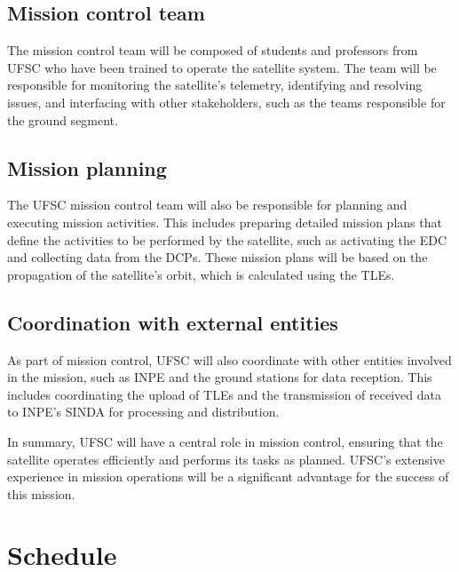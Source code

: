 \subsection{Mission control team}

The mission control team will be composed of students and professors from UFSC who have been trained to operate the satellite system. The team will be responsible for monitoring the satellite's telemetry, identifying and resolving issues, and interfacing with other stakeholders, such as the teams responsible for the ground segment.

\subsection{Mission planning}

The UFSC mission control team will also be responsible for planning and executing mission activities. This includes preparing detailed mission plans that define the activities to be performed by the satellite, such as activating the EDC and collecting data from the DCPs. These mission plans will be based on the propagation of the satellite's orbit, which is calculated using the TLEs.

\subsection{Coordination with external entities}

As part of mission control, UFSC will also coordinate with other entities involved in the mission, such as INPE and the ground stations for data reception. This includes coordinating the upload of TLEs and the transmission of received data to INPE's SINDA for processing and distribution.

In summary, UFSC will have a central role in mission control, ensuring that the satellite operates efficiently and performs its tasks as planned. UFSC's extensive experience in mission operations will be a significant advantage for the success of this mission.

\section{Schedule}

